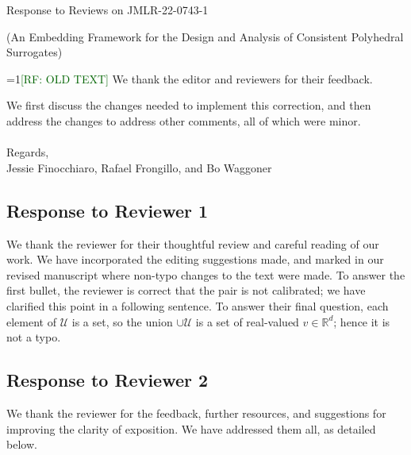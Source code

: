 \documentclass[a4paper]{article}
\newcommand{\Comments}{1}
\newcommand{\mynote}[2]{\ifnum\Comments=1\textcolor{#1}{#2}\fi}
\newcommand{\raf}[1]{\mynote{darkgreen}{[RF: #1]}}
\begin{document}
\begin{center}
  {\Large Response to Reviews on JMLR-22-0743-1}
  
  (An Embedding Framework for the Design and Analysis of Consistent Polyhedral Surrogates)
\end{center}

\raf{OLD TEXT}
  We thank the editor and reviewers for their feedback.  

We first discuss the changes needed to implement this correction, and then address the changes to address other comments, all of which were minor.\\
\\
Regards,\\
Jessie Finocchiaro, Rafael Frongillo, and Bo Waggoner

\subsection*{Response to Reviewer 1}

We thank the reviewer for their thoughtful review and careful reading of our work. We have incorporated the editing suggestions made, and marked in our revised manuscript where non-typo changes to the text were made. 
To answer the first bullet, the reviewer is correct that the pair is not calibrated; we have clarified this point in a following sentence. 
To answer their final question, each element of $\mathcal{U}$ is a set, so the union $\cup \mathcal{U}$ is a set of real-valued $v \in \mathbb{R}^d$; hence it is not a typo. 


\subsection*{Response to Reviewer 2}

We thank the reviewer for the feedback, further resources, and suggestions for improving the clarity of exposition.
We have addressed them all, as detailed below.
\end{document}
